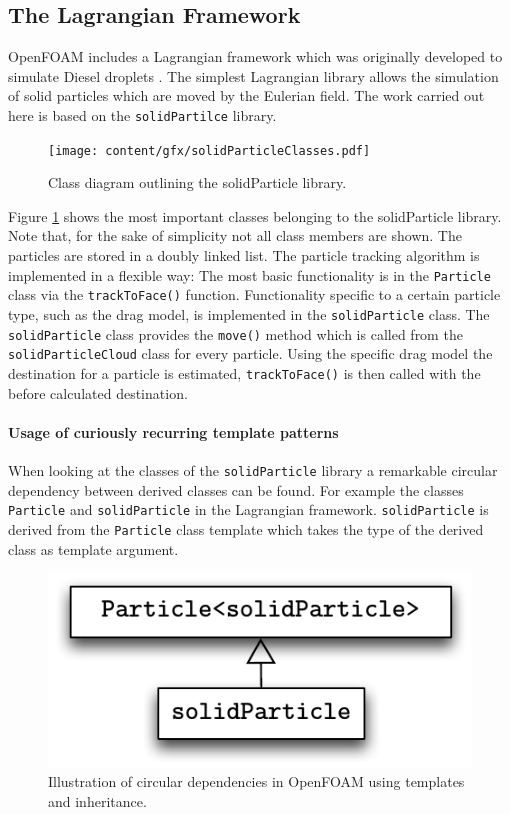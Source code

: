 \subsection{The Lagrangian Framework}
\label{sec:lagrangianFramework}

OpenFOAM includes a Lagrangian framework which was originally developed to simulate Diesel droplets \cite{nordin00}. The simplest Lagrangian library allows the simulation of solid particles which are moved by the Eulerian field. The work carried out here is based on the \verb+solidPartilce+ library.

\begin{figure}[H]
  \centering
  \texttt{[image: content/gfx/solidParticleClasses.pdf]}
  \caption{Class diagram outlining the solidParticle library.}
  \label{gfx:solidParticleClasses}
\end{figure}

Figure \ref{gfx:solidParticleClasses} shows the most important classes belonging to the solidParticle library. Note that, for the sake of simplicity not all class members are shown. The particles are stored in a doubly linked list. The particle tracking algorithm is implemented in a flexible way: The most basic functionality is in the \verb+Particle+ class via the \verb+trackToFace()+ function. Functionality specific to a certain particle type, such as the drag model, is implemented in the \verb+solidParticle+ class. The \verb+solidParticle+ class provides the \verb+move()+ method which is called from the \verb+solidParticleCloud+ class for every particle. Using the specific drag model the destination for a particle is estimated, \verb+trackToFace()+ is then called with the before calculated destination.

\paragraph{Usage of curiously recurring template patterns}

When looking at the classes of the \verb+solidParticle+ library a remarkable circular dependency between derived classes can be found. For example the classes \verb+Particle+ and \verb+solidParticle+ in the Lagrangian framework. \verb+solidParticle+ is derived from the \verb+Particle+ class template which takes the type of the derived class as template argument.

\begin{figure}[H]
  \centering
  \includegraphics[scale=0.6]{content/gfx/solidParticle.pdf}
  \caption{Illustration of circular dependencies in OpenFOAM using templates and inheritance.}
  \label{gfx:solidParticle}
\end{figure}

